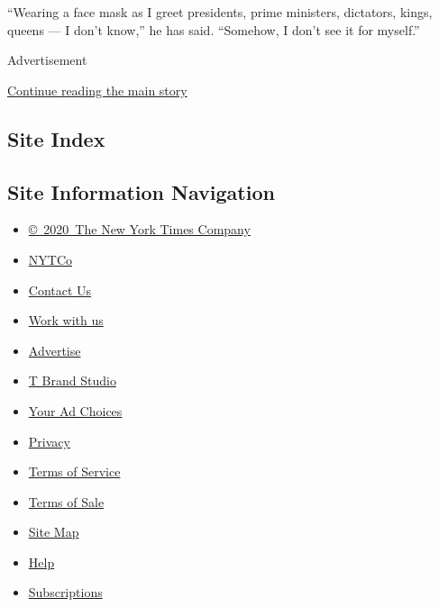 ``Wearing a face mask as I greet presidents, prime ministers, dictators,
kings, queens --- I don't know,'' he has said. ``Somehow, I don't see it
for myself.''

Advertisement

\protect\hyperlink{after-bottom}{Continue reading the main story}

\hypertarget{site-index}{%
\subsection{Site Index}\label{site-index}}

\hypertarget{site-information-navigation}{%
\subsection{Site Information
Navigation}\label{site-information-navigation}}

\begin{itemize}
\tightlist
\item
  \href{https://help.nytimes.com/hc/en-us/articles/115014792127-Copyright-notice}{©~2020~The
  New York Times Company}
\end{itemize}

\begin{itemize}
\tightlist
\item
  \href{https://www.nytco.com/}{NYTCo}
\item
  \href{https://help.nytimes.com/hc/en-us/articles/115015385887-Contact-Us}{Contact
  Us}
\item
  \href{https://www.nytco.com/careers/}{Work with us}
\item
  \href{https://nytmediakit.com/}{Advertise}
\item
  \href{http://www.tbrandstudio.com/}{T Brand Studio}
\item
  \href{https://www.nytimes.com/privacy/cookie-policy\#how-do-i-manage-trackers}{Your
  Ad Choices}
\item
  \href{https://www.nytimes.com/privacy}{Privacy}
\item
  \href{https://help.nytimes.com/hc/en-us/articles/115014893428-Terms-of-service}{Terms
  of Service}
\item
  \href{https://help.nytimes.com/hc/en-us/articles/115014893968-Terms-of-sale}{Terms
  of Sale}
\item
  \href{https://spiderbites.nytimes.com}{Site Map}
\item
  \href{https://help.nytimes.com/hc/en-us}{Help}
\item
  \href{https://www.nytimes.com/subscription?campaignId=37WXW}{Subscriptions}
\end{itemize}
